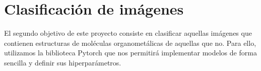 \begin{figure}[H]
\centering
\end{figure}

\newpage
\section{Clasificación de imágenes}
El segundo objetivo de este proyecto consiste en clasificar aquellas imágenes que contienen estructuras de moléculas organometálicas de aquellas que no. Para ello, utilizamos la biblioteca Pytorch que nos permitirá implementar modelos de forma sencilla y definir sus hiperparámetros.

